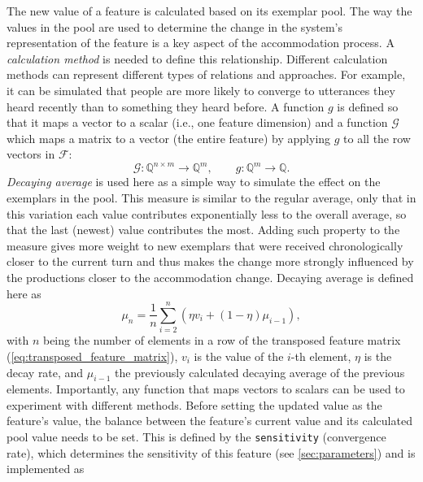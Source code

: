 The new value of a feature is calculated based on its exemplar pool.
The way the values in the pool are used to determine the change in the system's representation of the feature is a key aspect of the accommodation process.
A \textit{calculation method} is needed to define this relationship.
Different calculation methods can represent different types of relations and approaches.
For example, it can be simulated that people are more likely to converge to utterances they heard recently than to something they heard before.
A function $g$ is defined so that it maps a vector to a scalar (i.e., one feature dimension) and a function $\mathcal{G}$ which maps a matrix to a vector (the entire feature) by applying $g$ to all the row vectors in $\mathcal{F}$:
%
\begin{equation}
	\label{eq:matrix2vec}
	\mathcal{G}: \mathbb{Q}^{n \times m} \longrightarrow \mathbb{Q}^{m}, \qquad g: \mathbb{Q}^{m} \longrightarrow \mathbb{Q}.
\end{equation}
%
\textit{Decaying average} is used here as a simple way to simulate the effect on the exemplars in the pool.
This measure is similar to the regular average, only that in this variation each value contributes exponentially less to the overall average, so that the last (newest) value contributes the most.
Adding such property to the measure gives more weight to new exemplars that were received chronologically closer to the current turn and thus makes the change more strongly influenced by the productions closer to the accommodation change.
Decaying average is defined here as
\begin{equation}
	\label{eq:decaying_average}
	\mu_n = \frac{1}{n}\sum_{i = 2}^{n}(\eta v_i + (1 - \eta )\mu_{i-1}),
\end{equation}
%
with $n$ being the number of elements in a row of the transposed feature matrix (\cref{eq:transposed_feature_matrix}), $v_i$ is the value of the $i$-th element, $\eta$ is the decay rate, and $\mu_{i-1}$ the previously calculated decaying average of the previous elements.
Importantly, any function that maps vectors to scalars can be used to experiment with different methods.
Before setting the updated value as the feature's value, the balance between the feature's current value and its calculated pool value needs to be set.
This is defined by the \texttt{sensitivity} (convergence rate), which determines the sensitivity of this feature (see \cref{sec:parameters}) and is implemented as

